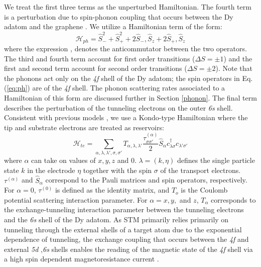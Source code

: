 \documentclass[reprint,amsmath,amssymb,aps,nofootinbib,onecolumn]{revtex4-2}
\begin{document}
We treat the first three terms as the unperturbed Hamiltonian. The fourth term is a perturbation due to spin-phonon coupling that occurs between the Dy adatom and the graphene \cite{cervetti2016,fort1998}. We utilize a Hamiltonian term of the form:
\begin{equation}
\mathcal{H}_{ph} = \hat{S}^{2}_{-} + \hat{S}^{2}_{+ } + 2 {\hat{S}_{-},\hat{S}_{z}} + 2 {\hat{S}_{+},\hat{S}_{z}}
\label{eq:ph}
\end{equation}
where the expression {,} denotes the anticommutator between the two operators. The third and fourth term account for first order transitions ($\Delta S = \pm 1$) and the first and second term account for second order transitions ($\Delta S = \pm 2$). Note that the phonons act only on the \textit{4f} shell of the Dy adatom; the spin operators in Eq. (\ref{eq:ph}) are of the \textit{4f} shell. The phonon scattering rates associated to a Hamiltonian of this form are discussed further in Section \ref{phonon}. The final term describes the perturbation of the tunneling electrons on the outer \textit{6s} shell. Consistent with previous models \cite{anderson1966,schrieffer1966,appelbaum1967,delgado2010,loth2010,Ternes2015}, we use a Kondo-type Hamiltonian where the tip and substrate electrons are treated as reservoirs:  
\begin{equation}
\mathcal{H}_{te} = \sum_{\alpha,\lambda, \lambda',\sigma,\sigma'} T_{\alpha,\lambda, \lambda'} \frac{\tau^{(\alpha)}_{\sigma\sigma'}}{2} \hat{S}_{\alpha} c^{\dagger}_{\lambda\sigma} c_{\lambda'\sigma'}
\end{equation}
where $\alpha$ can take on values of $x, y, z$ and $0$. $\lambda = (k,\eta)$ defines the single particle state $k$ in the electrode $\eta$ together with the spin $\sigma$ of the transport electrons. $\tau^{(\alpha)}$ and $\hat{S}_{\alpha}$ correspond to the Pauli matrices and spin operators, respectively. For $\alpha = 0$, $\tau^{(0)}$ is defined as the identity matrix, and $T_{o}$ is the Coulomb potential scattering interaction parameter. For $\alpha = x, y,$ and $z$, $T_{\alpha}$ corresponds to the exchange-tunneling interaction parameter between the tunneling electrons and the \textit{6s} shell of the Dy adatom. As STM primarily relies primarily on tunneling through the external shells of a target atom due to the exponential dependence of tunneling, the exchange coupling that occurs between the \textit{4f} and external \textit{5d} ,\textit{6s} shells enables the reading of the magnetic state of the \textit{4f} shell via a high spin dependent magnetoresistance current \cite{pivettaMeasuringIntraAtomicExchange2020}.\par
\end{document}
